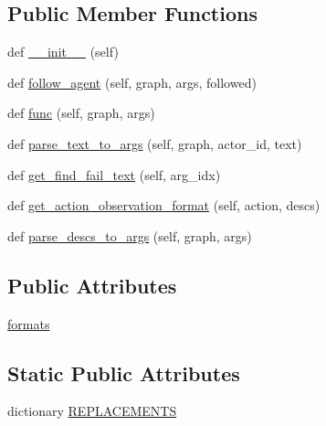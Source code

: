 \subsection*{Public Member Functions}
\begin{DoxyCompactItemize}
\item 
def \hyperlink{classlight__chats_1_1graph_1_1MoveAgentFunction_a817dbbcf1cf8973fb6227b6427d78bad}{\+\_\+\+\_\+init\+\_\+\+\_\+} (self)
\item 
def \hyperlink{classlight__chats_1_1graph_1_1MoveAgentFunction_adc15ccac3181a680d240e768a37b569e}{follow\+\_\+agent} (self, graph, args, followed)
\item 
def \hyperlink{classlight__chats_1_1graph_1_1MoveAgentFunction_a7ca8113d7746de96f740eaa61bda0c32}{func} (self, graph, args)
\item 
def \hyperlink{classlight__chats_1_1graph_1_1MoveAgentFunction_a107669f4e89172a53ac33649b9426439}{parse\+\_\+text\+\_\+to\+\_\+args} (self, graph, actor\+\_\+id, text)
\item 
def \hyperlink{classlight__chats_1_1graph_1_1MoveAgentFunction_a94bbc9319ec6a1a5229ded76406bfc58}{get\+\_\+find\+\_\+fail\+\_\+text} (self, arg\+\_\+idx)
\item 
def \hyperlink{classlight__chats_1_1graph_1_1MoveAgentFunction_a41f3e48e12425eab0bfc6cd5b8f3de0a}{get\+\_\+action\+\_\+observation\+\_\+format} (self, action, descs)
\item 
def \hyperlink{classlight__chats_1_1graph_1_1MoveAgentFunction_ac5ec1d33013cd1b2692d291f328e9a7b}{parse\+\_\+descs\+\_\+to\+\_\+args} (self, graph, args)
\end{DoxyCompactItemize}
\subsection*{Public Attributes}
\begin{DoxyCompactItemize}
\item 
\hyperlink{classlight__chats_1_1graph_1_1MoveAgentFunction_af70bc014668a0da4126b2edb64f71d98}{formats}
\end{DoxyCompactItemize}
\subsection*{Static Public Attributes}
\begin{DoxyCompactItemize}
\item 
dictionary \hyperlink{classlight__chats_1_1graph_1_1MoveAgentFunction_a15fb97abe73c7e378d6d4d04dedcd13b}{R\+E\+P\+L\+A\+C\+E\+M\+E\+N\+TS}
\end{DoxyCompactItemize}


